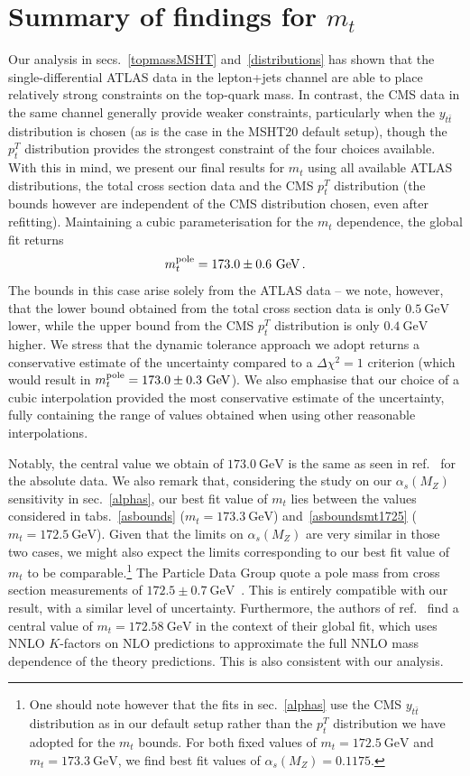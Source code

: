 \documentclass[sn-mathphys]{sn-jnl}%
\newcommand{\pT}{p^T_t}
\newcommand{\ytt}{y_{t\bar{t}}}
\newcommand{\mt}{m_t}
\newcommand{\as}{\alpha_s(M_Z)}
\newcommand{\gev}{\mathrm{GeV}}
\begin{document}
\section{Summary of findings for $\mt$}\label{summary}
Our analysis in secs.~\ref{topmassMSHT} and~\ref{distributions} has shown that the single-differential ATLAS data in the lepton+jets channel are able to place relatively strong constraints on the top-quark mass. In contrast, the CMS data in the same channel generally provide weaker constraints, particularly when the $\ytt$ distribution is chosen (as is the case in the MSHT20 default setup), though the $\pT$ distribution provides the strongest constraint of the four choices available. With this in mind, we present our final results for $\mt$ using all available ATLAS distributions, the total cross section data and the CMS $\pT$ distribution (the bounds however are independent of the CMS distribution chosen, even after refitting). Maintaining a cubic parameterisation for the $\mt$ dependence, the global fit returns 
\begin{equation}
    \mt^{\rm pole}=173.0\pm0.6~\gev\,.
\end{equation}
The bounds in this case arise solely from the ATLAS data -- we note, however, that the lower bound obtained from the total cross section data is only $0.5~\gev$ lower, while the upper bound from the CMS $\pT$ distribution is only $0.4~\gev$ higher. We stress that the dynamic tolerance approach we adopt returns a conservative estimate of the uncertainty compared to a $\Delta\chi^2=1$ criterion (which would result in $\mt^{\rm pole}=173.0\pm0.3~\gev$). We also emphasise that our choice of a cubic interpolation provided the most conservative estimate of the uncertainty, fully containing the range of values obtained when using other reasonable interpolations.

Notably, the central value we obtain of $173.0~\gev$ is the same as seen in ref.~\cite{Kadir:2020yml} for the absolute data. We also remark that, considering the study on our $\as$ sensitivity in sec.~\ref{alphas}, our best fit value of $\mt$ lies between the values considered in tabs.~\ref{asbounds} ($\mt=173.3~\gev$) and~\ref{asboundsmt1725} ($\mt=172.5~\gev$). Given that the limits on $\as$ are very similar in those two cases, we might also expect the limits corresponding to our best fit value of $\mt$ to be comparable.\footnote{One should note however that the fits in sec.~\ref{alphas} use the CMS $\ytt$ distribution as in our default setup rather than the $\pT$ distribution we have adopted for the $\mt$ bounds. For both fixed values of $\mt=172.5~\gev$ and $\mt=173.3~\gev$, we find best fit values of $\as=0.1175$.} The Particle Data Group quote a pole mass from cross section measurements of $172.5\pm0.7~\gev$~\cite{Workman:2022ynf}. This is entirely compatible with our result, with a similar level of uncertainty. Furthermore, the authors of ref.~\cite{Gao:2022srd} find a central value of $\mt=172.58~\gev$ in the context of their global fit, which uses NNLO $K$-factors on NLO predictions to approximate the full NNLO mass dependence of the theory predictions. This is also consistent with our analysis.
\end{document}
